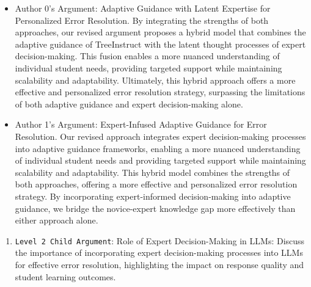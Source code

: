 \begin{enumerate}
\begin{enumerate}
        \begin{itemize}
            \item Author 0's Argument: Adaptive Guidance with Latent Expertise for Personalized Error Resolution. By integrating the strengths of both approaches, our revised argument proposes a hybrid model that combines the adaptive guidance of TreeInstruct with the latent thought processes of expert decision-making. This fusion enables a more nuanced understanding of individual student needs, providing targeted support while maintaining scalability and adaptability. Ultimately, this hybrid approach offers a more effective and personalized error resolution strategy, surpassing the limitations of both adaptive guidance and expert decision-making alone.
		\item Author 1's Argument: Expert-Infused Adaptive Guidance for Error Resolution. Our revised approach integrates expert decision-making processes into adaptive guidance frameworks, enabling a more nuanced understanding of individual student needs and providing targeted support while maintaining scalability and adaptability. This hybrid model combines the strengths of both approaches, offering a more effective and personalized error resolution strategy. By incorporating expert-informed decision-making into adaptive guidance, we bridge the novice-expert knowledge gap more effectively than either approach alone.
        \end{itemize}
    \end{enumerate}

\iffalse
    \begin{enumerate}
        \item \texttt{Level 2 Child Argument}: Role of Expert Decision-Making in LLMs: Discuss the importance of incorporating expert decision-making processes into LLMs for effective error resolution, highlighting the impact on response quality and student learning outcomes.


\end{enumerate}
\end{enumerate}
